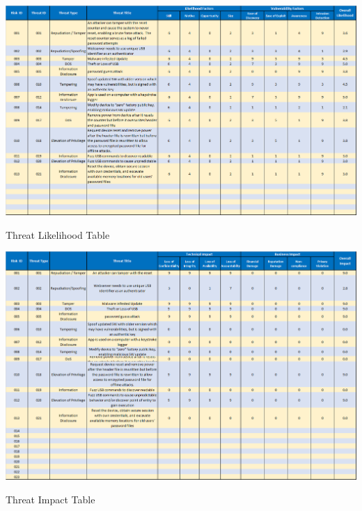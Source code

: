 \begin{table}
    \includegraphics[]{owasp_likelihood}
    \caption{Threat Likelihood Table}
    \label{tab:likelihood}
\end{table}

\begin{table}
    \includegraphics[]{owasp_impact}
    \caption{Threat Impact Table}
    \label{tab:impact}
\end{table}

